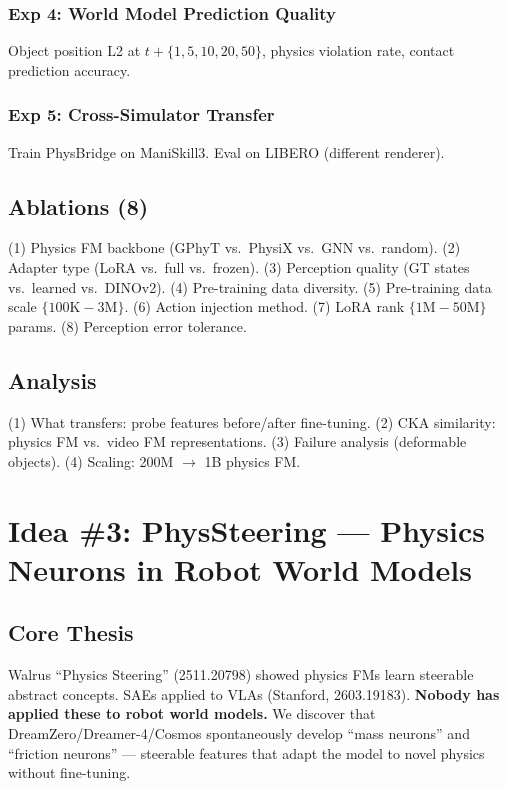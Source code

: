 \documentclass[11pt,a4paper]{article}
\begin{document}
\subsubsection{Exp 4: World Model Prediction Quality}
Object position L2 at $t{+}\{1,5,10,20,50\}$, physics violation rate, contact prediction accuracy.

\subsubsection{Exp 5: Cross-Simulator Transfer}
Train PhysBridge on ManiSkill3. Eval on LIBERO (different renderer).

\subsection{Ablations (8)}
(1) Physics FM backbone (GPhyT vs.\ PhysiX vs.\ GNN vs.\ random). (2) Adapter type (LoRA vs.\ full vs.\ frozen). (3) Perception quality (GT states vs.\ learned vs.\ DINOv2). (4) Pre-training data diversity. (5) Pre-training data scale $\{100\text{K}{-}3\text{M}\}$. (6) Action injection method. (7) LoRA rank $\{1\text{M}{-}50\text{M}\}$ params. (8) Perception error tolerance.

\subsection{Analysis}
(1) What transfers: probe features before/after fine-tuning. (2) CKA similarity: physics FM vs.\ video FM representations. (3) Failure analysis (deformable objects). (4) Scaling: 200M $\to$ 1B physics FM.

\newpage
\section{Idea \#3: PhysSteering --- Physics Neurons in Robot World Models}
\label{sec:physsteering}

\subsection{Core Thesis}

Walrus ``Physics Steering'' (2511.20798) showed physics FMs learn steerable abstract concepts. SAEs applied to VLAs (Stanford, 2603.19183). \textbf{Nobody has applied these to robot world models.} We discover that DreamZero/Dreamer-4/Cosmos spontaneously develop ``mass neurons'' and ``friction neurons'' --- steerable features that adapt the model to novel physics without fine-tuning.
\end{document}
